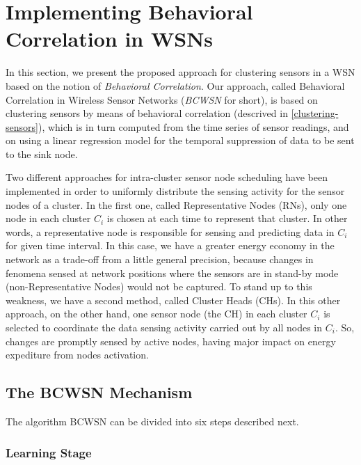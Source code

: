 \documentclass[conference]{IEEEtran}
\begin{document}
\section{Implementing Behavioral Correlation in WSNs}
\label{implementing-bcwsn}

In this section, we present the proposed approach for clustering sensors in a
WSN based on the notion of {\it Behavioral Correlation}. Our approach, called
Behavioral Correlation in Wireless Sensor Networks (\textit{BCWSN} for short),
is based on clustering sensors by means of behavioral correlation (descrived in
\ref{clustering-sensors}), which is in turn computed from the time series of
sensor readings, and on using a linear regression model for the temporal
suppression of data to be sent to the sink node.

Two different approaches for intra-cluster sensor node scheduling have been
implemented in order to uniformly distribute the sensing activity for the
sensor nodes of a cluster. In the first one, called Representative Nodes (RNs),
only one node in each cluster $C_{i}$ is chosen at each time to represent that
cluster. In other words, a representative node is responsible for sensing and
predicting data in $C_{i}$ for given time interval. In this case, we have a
greater energy economy in the network as a trade-off from a little
general precision, because changes in fenomena sensed at network positions where
the sensors are in stand-by mode (non-Representative Nodes) would not be
captured. To stand up to this weakness, we have a second method, called
Cluster Heads (CHs). In this other approach, on the other hand, one sensor node
(the CH) in each cluster $C_{i}$ is selected to coordinate the data sensing
activity carried out by all nodes in $C_{i}$. So, changes are promptly sensed by
active nodes, having major impact on energy expediture from nodes activation.

\subsection{The BCWSN Mechanism}


The algorithm BCWSN can be divided into six steps described next.


\subsubsection{Learning Stage}
\end{document}
